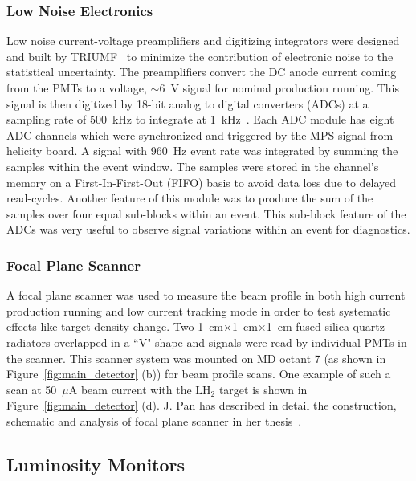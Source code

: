 \subsubsection{Low Noise Electronics}%
\label{Low Noise Electronics}

Low noise current-voltage preamplifiers and digitizing integrators were designed and built by TRIUMF~\cite{website:TRIUMF} to minimize the contribution of electronic noise to the statistical uncertainty. The preamplifiers convert the DC anode current coming from the PMTs to a voltage, $\sim$6~V signal for nominal production running. This signal is then digitized by 18-bit analog to digital converters (ADCs) at a sampling rate of 500~kHz to integrate at 1~kHz~\cite{manual_TRIUMF_ADC}. Each ADC module has eight ADC channels which were synchronized and triggered by the MPS signal from helicity board. A signal with 960~Hz event rate was integrated by summing the samples within the event window.  The samples were stored in the channel's memory on a First-In-First-Out (FIFO) basis to avoid data loss due to delayed read-cycles. Another feature of this module was to produce the sum of the samples over four equal sub-blocks within an event. This sub-block feature of the ADCs was very useful to observe signal variations within an event for diagnostics. 


\subsubsection{Focal Plane Scanner}%
\label{Focal Plane Scanner}

A focal plane scanner was used to measure the beam profile in both high current production running and low current tracking mode in order to test systematic effects like target density change. Two 1~cm$\times$1~cm$\times$1~cm fused silica quartz radiators overlapped in a ``V" shape and signals were read by individual PMTs in the scanner. This scanner system was mounted on MD octant 7 (as shown in Figure~\ref{fig:main_detector} (b)) for beam profile scans. One example of such a scan at 50~$\mu$A beam current with the LH$_{2}$ target is shown in Figure~\ref{fig:main_detector} (d). J. Pan has described in detail the construction, schematic and analysis of focal plane scanner in her thesis~\cite{jie_qweak_thesis}.


\subsection{Luminosity Monitors}%
\label{Luminosity Monitors}


